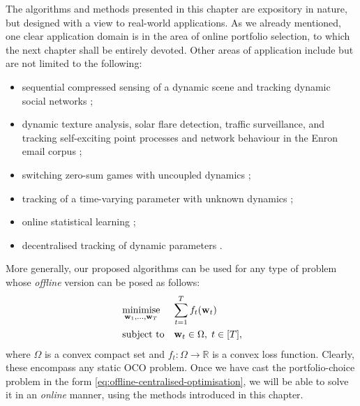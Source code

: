 The algorithms and methods presented in this chapter are expository in nature, but designed with a view to real-world applications. As we already mentioned, one clear application domain is in the area of online portfolio selection, to which the next chapter shall be entirely devoted. Other areas of application include but are not limited to the following:
%
\begin{itemize}
	\item sequential compressed sensing of a dynamic scene and tracking dynamic social networks \citep{hall&willett13};
	\item dynamic texture analysis, solar flare detection, traffic surveillance, and tracking self-exciting point processes and network behaviour in the Enron email corpus \citep{hall&willett15};
	\item switching zero-sum games with uncoupled dynamics \citep{jadbabaie15};
	\item tracking of a time-varying parameter with unknown dynamics \citep{mokhtari16};
	\item online statistical learning \citep{zhang17};
	\item decentralised tracking of dynamic parameters \citep{shahrampour18}.
\end{itemize}

More generally, our proposed algorithms can be used for any type of problem whose \emph{offline} version can be posed as follows:
\begin{equation}
\label{eq:offline-centralised-optimisation}
\begin{split}
	& \operatorname*{minimise}_{\mathbf{w}_1, \ldots, \mathbf{w}_T} \quad\; \sum_{t=1}^T f_t(\mathbf{w}_t)
	\\
	&\, \text{subject to} \quad \mathbf{w}_t \in \Omega,\; t \in [T],
\end{split}
\end{equation}
where $\Omega$ is a convex compact set and $f_t : \Omega \rightarrow \mathbb{R}$ is a convex loss function. Clearly, these encompass any static OCO problem. %
Once we have cast the portfolio-choice problem in the form \eqref{eq:offline-centralised-optimisation}, we will be able to solve it in an \emph{online} manner, using the methods introduced in this chapter.